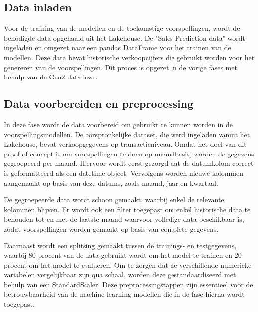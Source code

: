 \newpage

\subsection{Data inladen}

Voor de training van de modellen en de toekomstige voorspellingen, wordt de benodigde data opgehaald uit het Lakehouse. De "Sales Prediction data" wordt ingeladen en omgezet naar een pandas DataFrame voor het trainen van de modellen. Deze data bevat historische verkoopcijfers die gebruikt worden voor het genereren van de voorspellingen. Dit proces is opgezet in de vorige fases met behulp van de Gen2 dataflows.



\subsection*{Data voorbereiden en preprocessing}

In deze fase wordt de data voorbereid om gebruikt te kunnen worden in de voorspellingsmodellen. De oorspronkelijke dataset, die werd ingeladen vanuit het Lakehouse, bevat verkoopgegevens op transactieniveau. Omdat het doel van dit proof of concept is om voorspellingen te doen op maandbasis, worden de gegevens gegroepeerd per maand. Hiervoor wordt eerst gezorgd dat de datumkolom correct is geformatteerd als een datetime-object. Vervolgens worden nieuwe kolommen aangemaakt op basis van deze datums, zoals maand, jaar en kwartaal.

\vspace{1em} 

De gegroepeerde data wordt schoon gemaakt, waarbij enkel de relevante kolommen blijven. Er wordt ook een filter toegepast om enkel historische data te behouden tot en met de laatste maand waarvoor volledige data beschikbaar is, zodat voorspellingen worden gemaakt op basis van complete gegevens.

\vspace{1em} 

Daarnaast wordt een splitsing gemaakt tussen de trainings- en testgegevens, waarbij 80 procent van de data gebruikt wordt om het model te trainen en 20 procent om het model te evalueren. Om te zorgen dat de verschillende numerieke variabelen vergelijkbaar zijn qua schaal, worden deze gestandaardiseerd met behulp van een StandardScaler. Deze preprocessingstappen zijn essentieel voor de betrouwbaarheid van de machine learning-modellen die in de fase hierna wordt toegepast.

